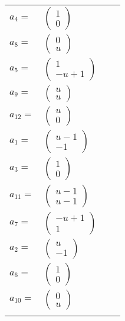 \documentclass[1p]{elsarticle_modified}
\theoremstyle{definition}
\begin{document}
\begin{tabular}{m{7pt} m{180pt} m{7pt} m{180pt} }
\flushright $a_{4}=$&$\begin{pmatrix}1\\0\end{pmatrix}$ \\
\flushright $a_{8}=$&$\begin{pmatrix}0\\u\end{pmatrix}$ \\
\flushright $a_{5}=$&$\begin{pmatrix}1\\- u+1\end{pmatrix}$ \\
\flushright $a_{9}=$&$\begin{pmatrix}u\\u\end{pmatrix}$ \\
\flushright $a_{12}=$&$\begin{pmatrix}u\\0\end{pmatrix}$ \\
\flushright $a_{1}=$&$\begin{pmatrix}u-1\\-1\end{pmatrix}$ \\
\flushright $a_{3}=$&$\begin{pmatrix}1\\0\end{pmatrix}$ \\
\flushright $a_{11}=$&$\begin{pmatrix}u-1\\u-1\end{pmatrix}$ \\
\flushright $a_{7}=$&$\begin{pmatrix}- u+1\\1\end{pmatrix}$ \\
\flushright $a_{2}=$&$\begin{pmatrix}u\\-1\end{pmatrix}$ \\
\flushright $a_{6}=$&$\begin{pmatrix}1\\0\end{pmatrix}$ \\
\flushright $a_{10}=$&$\begin{pmatrix}0\\u\end{pmatrix}$\\&\end{tabular}
\end{document}
